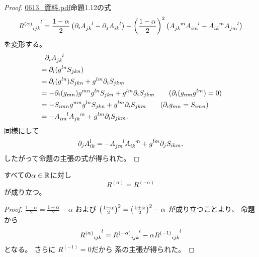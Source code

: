 \documentclass[report]{jlreq}
\begin{document}
\begin{proof}
    \url{0613_資料.pdf}命題1.12の式
    \begin{equation}
        {R^{(\alpha)}}_{ijk}^{\hphantom{ijk}l}
            = \frac{1 - \alpha}{2} \left({
                \partial_i A_{jk}^{\hphantom{jk}l}
                -
                \partial_j A_{ik}^{\hphantom{ik}l}
            }\right)
            + \left({\frac{1 - \alpha}{2}}\right)^2
            \left({
                A_{jk}^{\hphantom{jk}m} A_{im}^{\hphantom{im}l}
                -
                A_{ik}^{\hphantom{ik}m} A_{jm}^{\hphantom{jm}l}
            }\right)
    \end{equation}
    を変形する。
    \begin{alignat}{1}
        &\phantom{=}
            \partial_i A_{jk}^{\hphantom{jk}l}
            \\
        &=
            \partial_i (g^{ln} S_{jkn})
            \\
        &=
            \partial_i (g^{ln}) S_{jkn}
            +
            g^{lm} \partial_i S_{jkm}
            \\
        &=
            - \partial_i (g_{mn}) g^{mn} g^{ln} S_{jkn}
            +
            g^{lm} \partial_i S_{jkm}
            \qquad
            (\partial_i(g_{nm} g^{lm}) = 0)
            \\
        &=
            - S_{imn} g^{mn} g^{ln} S_{jkn}
            +
            g^{lm} \partial_i S_{jkm}
            \qquad
            (\partial_i g_{mn} = S_{imn})
            \\
        &=
            - A_{im}^{\hphantom{im}l} A_{jk}^{\hphantom{jk}m}
            + g^{lm} \partial_i S_{jkm}.
    \end{alignat}
    同様にして
    \begin{alignat}{1}
        \partial_j A_{ik}^l
            =
                - A_{jm}^{\hphantom{jm}l} A_{ik}^{\hphantom{ik}m}
                + g^{lm} \partial_j S_{ikm}.
    \end{alignat}
    したがって命題の主張の式が得られた。
\end{proof}

\begin{corollary}
    すべての$\alpha \in \mathbb{R}$に対し
    \begin{equation}
        R^{(\alpha)}
            =
                R^{(-\alpha)}
    \end{equation}
    が成り立つ。
\end{corollary}

\begin{proof}
    $\frac{1 - \alpha}{2} = \frac{1 + \alpha}{2} - \alpha$
    および
    $\left({
        \frac{1 - \alpha}{2}
    }\right)^2
        =
            \left({
                \frac{1 + \alpha}{2}
            }\right)^2 - \alpha$
    が成り立つことより、
    命題から
    \begin{equation}
        {R^{(\alpha)}}_{ijk}^{\hphantom{ijk}l}
            =
                {R^{(-\alpha)}}_{ijk}^{\hphantom{ijk}l}
                - \alpha {R^{(-1)}}_{ijk}^{\hphantom{ijk}l}
    \end{equation}
    となる。
    さらに
    $R^{(-1)} = 0$だから
    系の主張が得られた。
\end{proof}
\end{document}
